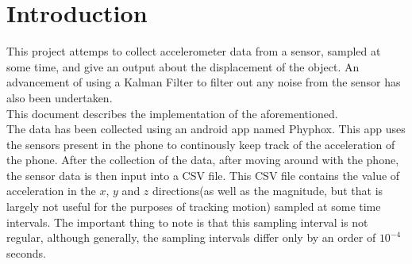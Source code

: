 \documentclass[oneside]{book}
\begin{document}

\newpage
\tableofcontents
\newpage
\Large

\chapter{Introduction} \label{Chapter-1}
This project attemps to collect accelerometer data from a sensor, sampled at some time, and give an output about the displacement of the object. An advancement of using a Kalman Filter to filter out any noise from the sensor has also been undertaken.\\ 
This document describes the implementation of the aforementioned. \\
\bigskip
The data has been collected using an android app named Phyphox. This app uses the sensors present in the phone to continously keep track of the acceleration of the phone. After the collection of the data, after moving around with the phone, the sensor data is then input into a CSV file. This CSV file contains the value of acceleration in the $x$, $y$ and $z$ directions(as well as the magnitude, but that is largely not useful for the purposes of tracking motion) sampled at some time intervals. The important thing to note is that this sampling interval is not regular, although generally, the sampling intervals differ only by an order of $10^{-4}$ seconds. 

\newpage
\end{document}
